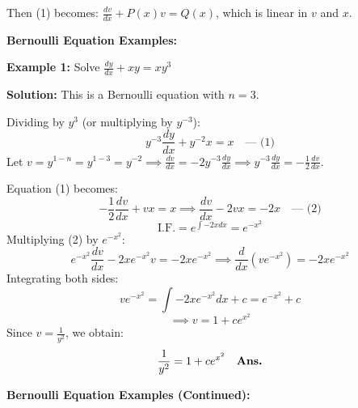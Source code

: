 \documentclass[11pt,a4paper]{article}
\newcommand{\Heading}[1]{\vspace{0.3cm}\noindent\textbf{\textcolor{AcademicGreen}{\large #1}}\par\vspace{0.15cm}}
\begin{document}
\noindent Then (1) becomes: $\frac{dv}{dx} + P(x)v = Q(x)$, which is linear in $v$ and $x$.

\newpage

\Heading{Bernoulli Equation Examples:}

\begin{tcolorbox}[greenbox]
    \textbf{\textcolor{AcademicGreen}{Example 1:}} Solve $\frac{dy}{dx} + xy = xy^3$
    
    \vspace{0.15cm}
    \noindent\textbf{Solution:} This is a Bernoulli equation with $n=3$.
    
    \noindent Dividing by $y^3$ (or multiplying by $y^{-3}$):
    \[
    y^{-3}\frac{dy}{dx} + y^{-2}x = x \quad \text{--- (1)}
    \]
    Let $v = y^{1-n} = y^{1-3} = y^{-2} \implies \frac{dv}{dx} = -2y^{-3}\frac{dy}{dx} \implies y^{-3}\frac{dy}{dx} = -\frac{1}{2}\frac{dv}{dx}$.
    
    \noindent Equation (1) becomes:
    \[
    -\frac{1}{2}\frac{dv}{dx} + v x = x \implies \frac{dv}{dx} - 2vx = -2x \quad \text{--- (2)}
    \]
    \[
    \text{I.F.} = e^{\int -2x dx} = e^{-x^2}
    \]
    Multiplying (2) by $e^{-x^2}$:
    \[
    e^{-x^2}\frac{dv}{dx} - 2x e^{-x^2}v = -2x e^{-x^2} \implies \frac{d}{dx}\left(v e^{-x^2}\right) = -2x e^{-x^2}
    \]
    Integrating both sides:
    \[
    v e^{-x^2} = \int -2x e^{-x^2} dx + c = e^{-x^2} + c
    \]
    \[
    \implies v = 1 + c e^{x^2}
    \]
    Since $v = \frac{1}{y^2}$, we obtain:
    \[
    \frac{1}{y^2} = 1 + c e^{x^2} \quad \text{\textbf{Ans.}}
    \]
\end{tcolorbox}

\newpage

\Heading{Bernoulli Equation Examples (Continued):}
\end{document}
